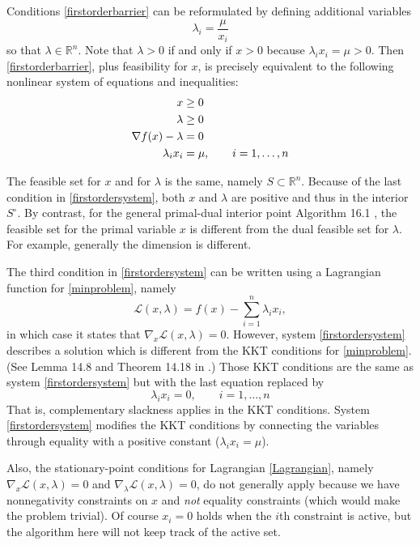 \documentclass[11pt]{article}
\newcommand{\RR}{\mathbb{R}}
\newcommand{\grad}{\nabla}
\begin{document}
Conditions \eqref{firstorderbarrier} can be reformulated by defining additional variables
    $$\lambda_i = \frac{\mu}{x_i}$$
so that $\lambda\in\RR^n$.  Note that $\lambda>0$ if and only if $x>0$ because $\lambda_i x_i = \mu > 0$.  Then \eqref{firstorderbarrier}, plus feasibility for $x$, is precisely equivalent to the following nonlinear system of equations and inequalities:
\begin{align}
x &\ge 0 \label{firstordersystem} \\
\lambda &\ge 0 \notag \\
\grad f(x) - \lambda &= 0 \notag \\
\lambda_i x_i &= \mu, \qquad i=1,\dots,n \notag
\end{align}

The feasible set for $x$ and for $\lambda$ is the same, namely $S \subset \RR^n$.  Because of the last condition in \eqref{firstordersystem}, both $x$ and $\lambda$ are positive and thus in the interior $S^\circ$.  By contrast, for the general primal-dual interior point Algorithm 16.1 \cite[section 16.7]{GrivaNashSofer2009}, the feasible set for the primal variable $x$ is different from the dual feasible set for $\lambda$.  For example, generally the dimension is different.

The third condition in \eqref{firstordersystem} can be written using a Lagrangian function for \eqref{minproblem}, namely
\begin{equation}
\mathcal{L}(x,\lambda) = f(x) - \sum_{i=1}^n \lambda_i x_i,  \label{Lagrangian}
\end{equation}
in which case it states that $\grad_x \mathcal{L}(x,\lambda)=0$.  However, system \eqref{firstordersystem} describes a solution which is different from the KKT conditions for \eqref{minproblem}.  (See Lemma 14.8 and Theorem 14.18 in \cite{GrivaNashSofer2009}.)  Those KKT conditions are the same as system \eqref{firstordersystem} but with the last equation replaced by
\begin{equation}
\lambda_i x_i = 0, \qquad i=1,\dots,n  \label{complementaryslackness}
\end{equation}
That is, complementary slackness applies in the KKT conditions.  System \eqref{firstordersystem} modifies the KKT conditions by connecting the variables through equality with a positive constant ($\lambda_i x_i = \mu$).

Also, the stationary-point conditions for Lagrangian \eqref{Lagrangian}, namely $\grad_x\mathcal{L}(x,\lambda)=0$ and $\grad_\lambda\mathcal{L}(x,\lambda)=0$, do not generally apply because we have nonnegativity constraints on $x$ and \emph{not} equality constraints (which would make the problem trivial).  Of course $x_i=0$ holds when the $i$th constraint is active, but the algorithm here will not keep track of the active set.
\end{document}
